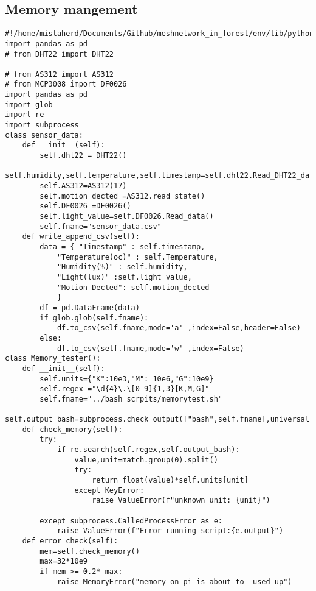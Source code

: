 \subsection{Memory mangement}
\begin{lstlisting}[style=mystyle,caption={Code for  memory mangement }]
#!/home/mistaherd/Documents/Github/meshnetwork_in_forest/env/lib/python3.11
import pandas as pd
# from DHT22 import DHT22

# from AS312 import AS312
# from MCP3008 import DF0026
import pandas as pd
import glob
import re 
import subprocess
class sensor_data:
	def __init__(self):
		self.dht22 = DHT22()
		self.humidity,self.temperature,self.timestamp=self.dht22.Read_DHT22_data()
		self.AS312=AS312(17)
		self.motion_dected =AS312.read_state()
		self.DF0026 =DF0026()
		self.light_value=self.DF0026.Read_data()
		self.fname="sensor_data.csv"
	def write_append_csv(self):
		data = { "Timestamp" : self.timestamp,
			"Temperature(oc)" : self.Temperature,
			"Humidity(%)" : self.humidity,
			"Light(lux)" :self.light_value,
			"Motion Dected": self.motion_dected
			}
		df = pd.DataFrame(data)
		if glob.glob(self.fname):	
			df.to_csv(self.fname,mode='a' ,index=False,header=False)
		else:
			df.to_csv(self.fname,mode='w' ,index=False)
class Memory_tester():
	def __init__(self):
		self.units={"K":10e3,"M": 10e6,"G":10e9}
		self.regex ="\d{4}\.\[0-9]{1,3}[K,M,G]"
		self.fname="../bash_scrpits/memorytest.sh" 
		self.output_bash=subprocess.check_output(["bash",self.fname],universal_newlines=True)
	def check_memory(self):
		try:
			if re.search(self.regex,self.output_bash):
				value,unit=match.group(0).split()
				try:
					return float(value)*self.units[unit]
				except KeyError:
					raise ValueError(f"unknown unit: {unit}")
			
		except subprocess.CalledProcessError as e:
			raise ValueError(f"Error running script:{e.output}")
	def error_check(self):
		mem=self.check_memory()
		max=32*10e9
		if mem >= 0.2* max:
			raise MemoryError("memory on pi is about to  used up")
		
\end{lstlisting}
